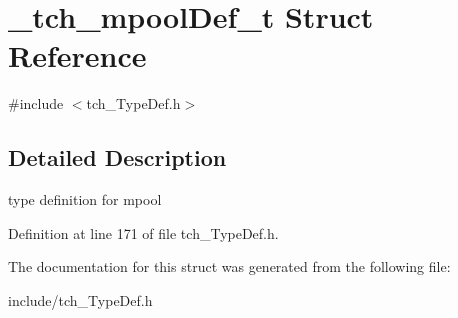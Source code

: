 \hypertarget{struct__tch__mpool_def__t}{\section{\+\_\+tch\+\_\+mpool\+Def\+\_\+t Struct Reference}
\label{struct__tch__mpool_def__t}
}


{\ttfamily \#include $<$tch\+\_\+\+Type\+Def.\+h$>$}



\subsection{Detailed Description}
type definition for mpool 

Definition at line 171 of file tch\+\_\+\+Type\+Def.\+h.



The documentation for this struct was generated from the following file\+:\begin{DoxyCompactItemize}
\item 
include/tch\+\_\+\+Type\+Def.\+h\end{DoxyCompactItemize}
